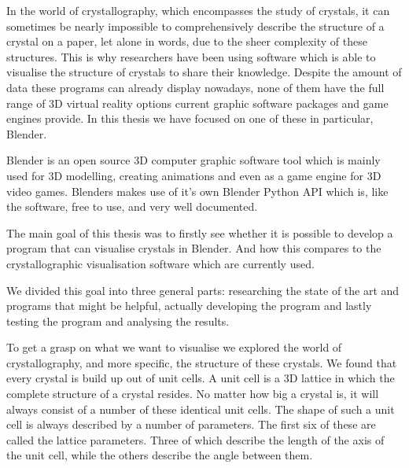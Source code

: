 In the world of crystallography, which encompasses the study of crystals, it can sometimes be nearly impossible to comprehensively describe the structure of a crystal on a paper, let alone in words, due to the sheer complexity of these structures. This is why researchers have been using software which is able to visualise the structure of crystals to share their knowledge. Despite the amount of data these programs can already display nowadays, none of them have the full range of 3D virtual reality options current graphic software packages and game engines provide. In this thesis we have focused on one of these in particular, Blender.
\par
Blender is an open source 3D computer graphic software tool which is mainly used for 3D modelling, creating animations and even as a game engine for 3D video games. Blenders makes use of it's own Blender Python API which is, like the software, free to use, and very well documented.
\par
The main goal of this thesis was to firstly see whether it is possible to develop a program that can visualise crystals in Blender. And how this compares to the crystallographic visualisation software which are currently used.
\par
We divided this goal into three general parts: researching the state of the art and programs that might be helpful, actually developing the program and lastly testing the program and analysing the results. 
\par
To get a grasp on what we want to visualise we explored the world of crystallography, and more specific, the structure of these crystals. We found that every crystal is build up out of unit cells. A unit cell is a 3D lattice in which the complete structure of a crystal resides. No matter how big a crystal is, it will always consist of a number of these identical unit cells. The shape of such a unit cell is always described by a number of parameters. The first six of these are called the lattice parameters. Three of which describe the length of the axis of the unit cell, while the others describe the angle between them.  